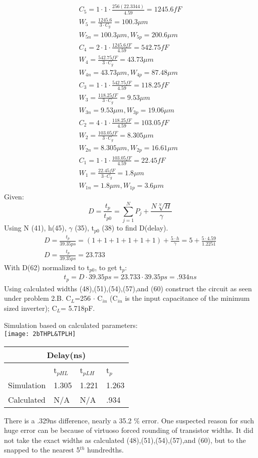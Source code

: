 \documentclass{article}
\begin{document}
\begin{gather}
C_{5}=1\cdot 1\cdot \frac{256(22.3344)}{4.59}=1245.6fF\\
W_{5}= \frac{1245.6}{3\cdot C_{g}}= 100.3\mu m\\
W_{5n}= 100.3\mu m , W_{5p}= 200.6\mu m\\
C_{4}=2\cdot 1\cdot \frac{1245.6fF}{4.59}=542.75fF\\
W_{4}= \frac{542.75fF}{3\cdot C_{g}}= 43.73\mu m\\
W_{4n}= 43.73\mu m , W_{4p}= 87.48\mu m\\
C_{3}=1\cdot 1\cdot \frac{542.75fF}{4.59}=118.25fF\\
W_{3}= \frac{118.25fF}{3\cdot C_{g}}= 9.53\mu m\\
W_{3n}= 9.53\mu m , W_{3p}= 19.06\mu m\\
C_{2}=4\cdot 1\cdot \frac{118.25fF}{4.59}=103.05fF\\
W_{2}= \frac{103.05fF}{3\cdot C_{g}}= 8.305\mu m\\
W_{2n}= 8.305\mu m , W_{2p}= 16.61\mu m\\
C_{1}=1\cdot 1\cdot \frac{103.05fF}{4.59}=22.45fF\\
W_{1}= \frac{22.45fF}{3\cdot C_{g}}= 1.8\mu m\\
W_{1n}= 1.8\mu m , W_{1p}= 3.6\mu m
\end{gather}
Given:
\begin{displaymath}
D = \frac{t_{p}}{t_{p0}}= \sum_{j=1}^{N}P_{j} + \frac{N\sqrt[N]{H}}{\gamma}
\end{displaymath}
Using N (41), h(45), $\gamma$ (35), t$_{p0}$ (38) to find D(delay).
\begin{gather}
D = \frac{t_{p}}{39.35ps}=(1+1+1+1+1+1) + \frac{5\cdot h}{\gamma}= 5 + \frac{5\cdot 4.59}{1.2251}\\
D = \frac{t_{p}}{39.35ps} = 23.733
\end{gather}
With D(62) normalized to  t$_{p0}$, to get t$_{p}$:
\begin{gather}
t_{p}= D \cdot 39.35ps = 23.733 \cdot 39.35ps= .934ns
\end{gather}
Using calculated widths (48),(51),(54),(57),and (60) construct the circuit as seen under problem 2.B. C$_{L}$=256 $\cdot$ C$_{in}$ (C$_{in}$ is the input capacitance of the minimum sized inverter);  C$_{L}$= 5.718pF.
\begin{center}
Simulation based on calculated parameters:\\
\texttt{[image: 2bTHPL\&TPLH]}\\
\begin{tabular}{|p{2cm}||p{2cm}|p{2cm}|p{2cm}|}
 	\hline
 	\multicolumn{4}{|c|}{Delay(ns)} \\
 		\hline
  		&t$_{pHL}$ & t$_{pLH}$ & t$_{p}$\\
 		\hline   
 		Simulation & 1.305 &1.221& 1.263 \\
	 	Calculated & N/A &N/A&.934 \\
 		\hline
 	\end{tabular}
\end{center}
There is a .329ns difference, nearly a 35.2 $\%$ error. One suspected reason for such huge error can be because of virtuoso forced rounding of transistor widths. It did not take the exact widths as calculated (48),(51),(54),(57),and (60), but to the snapped to the nearest 5$^{th}$ hundredths. 
\end{document}
